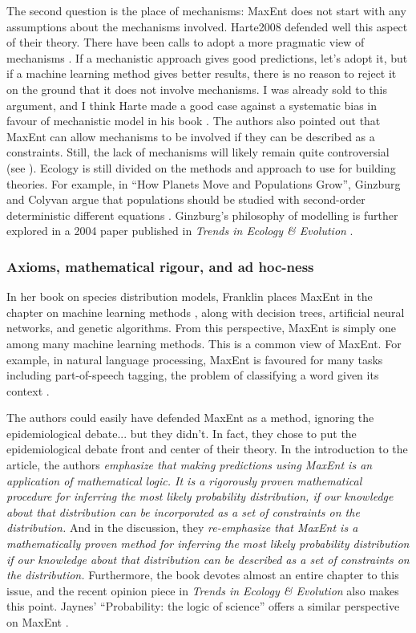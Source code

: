\documentclass[letterpaper,12pt]{article}
\begin{document}
The second question is the place of mechanisms: MaxEnt does not start with
any assumptions about the mechanisms involved. Harte2008 defended well this
aspect of their theory. There have been calls to adopt a more pragmatic view
of mechanisms \cite{mcg10}. If a mechanistic approach gives good
predictions, let's adopt it, but if a machine learning method gives better
results, there is no reason to reject it on the ground that it does not
involve mechanisms. I was already sold to this argument, and I think Harte
made a good case against a systematic bias in favour of mechanistic model in
his book \cite{har11}. The authors also pointed out that MaxEnt can allow
mechanisms to be involved if they can be described as a constraints. Still,
the lack of mechanisms will likely remain quite controversial (see \cite
{tur03,cla09,wen12}). Ecology is still divided on the methods and approach
to use for building theories. For example, in ``How Planets Move and
Populations Grow'', Ginzburg and Colyvan argue that populations should be
studied with second-order deterministic different equations \cite
{gin86,gin04}. Ginzburg's philosophy of modelling is further explored in a
2004 paper published in \emph{Trends in Ecology \& Evolution} \cite {gin04b}.

\subsubsection{Axioms, mathematical rigour, and ad hoc-ness}

In her book on species distribution models, Franklin places MaxEnt in the
chapter on machine learning methods \cite{fra10}, along with decision trees,
artificial neural networks, and genetic algorithms. From this perspective,
MaxEnt is simply one among many machine learning methods. This is a common
view of MaxEnt. For example, in natural language processing, MaxEnt is
favoured for many tasks including part-of-speech tagging, the problem of
classifying a word given its context \cite{man99}.

The authors could easily have defended MaxEnt as a method, ignoring the
epidemiological debate... but they didn't. In fact, they chose to put the
epidemiological debate front and center of their theory. In the introduction
to the article, the authors \emph{emphasize that making predictions using
MaxEnt is an application of mathematical logic. It is a rigorously proven
mathematical procedure for inferring the most likely probability
distribution, if our knowledge about that distribution can be incorporated
as a set of constraints on the distribution.} And in the discussion, they
\emph{re-emphasize that MaxEnt is a mathematically proven method for
inferring the most likely probability distribution if our knowledge about
that distribution can be described as a set of constraints on the
distribution.} Furthermore, the book devotes almost an entire chapter to
this issue, and the recent opinion piece in \emph{Trends in Ecology \&
Evolution} also makes this point. Jaynes' ``Probability: the logic
of science'' offers a similar perspective on MaxEnt \cite{jay03}.
\end{document}
